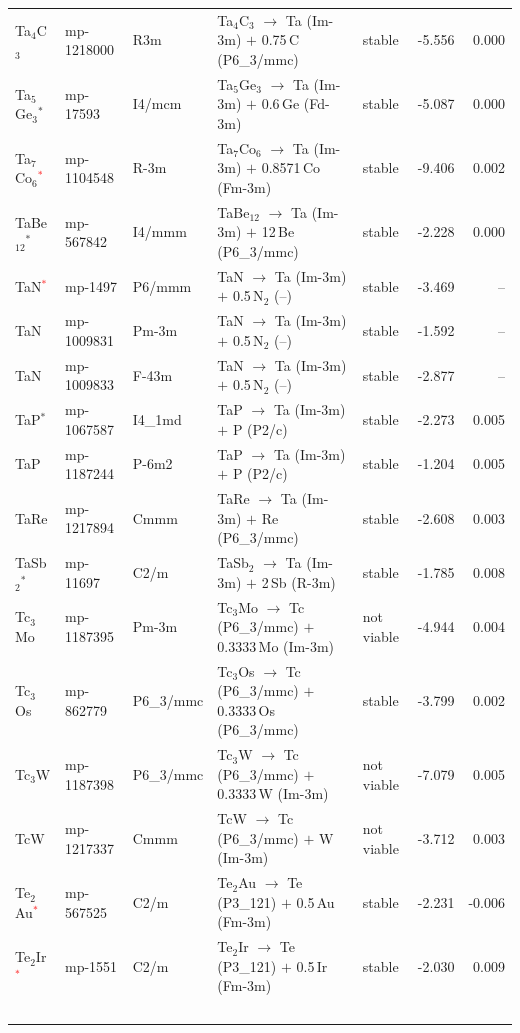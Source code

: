 \begin{longtable}{@{}ll l@{\hspace{4pt}} p{4.6cm} l@{\hspace{4pt}} rr@{}}
Ta$_{4}$C$_{3}$ & mp-1218000 & R3m & Ta$_{4}$C$_{3}$ $\to$ Ta (Im-3m) $+$ 0.75\,C (P6\_3/mmc) & stable & -5.556 & 0.000 \\
Ta$_{5}$Ge$_{3}$$^*$ & mp-17593 & I4/mcm & Ta$_{5}$Ge$_{3}$ $\to$ Ta (Im-3m) $+$ 0.6\,Ge (Fd-3m) & stable & -5.087 & 0.000 \\
Ta$_{7}$Co$_{6}$\textcolor{red}{$^*$} & mp-1104548 & R-3m & Ta$_{7}$Co$_{6}$ $\to$ Ta (Im-3m) $+$ 0.8571\,Co (Fm-3m) & stable & -9.406 & 0.002 \\
TaBe$_{12}$$^*$ & mp-567842 & I4/mmm & TaBe$_{12}$ $\to$ Ta (Im-3m) $+$ 12\,Be (P6\_3/mmc) & stable & -2.228 & 0.000 \\
TaN\textcolor{red}{$^*$} & mp-1497 & P6/mmm & TaN $\to$ Ta (Im-3m) $+$ 0.5\,N$_{2}$ (--) & stable & -3.469 & -- \\
TaN & mp-1009831 & Pm-3m & TaN $\to$ Ta (Im-3m) $+$ 0.5\,N$_{2}$ (--) & stable & -1.592 & -- \\
TaN & mp-1009833 & F-43m & TaN $\to$ Ta (Im-3m) $+$ 0.5\,N$_{2}$ (--) & stable & -2.877 & -- \\
TaP$^*$ & mp-1067587 & I4\_1md & TaP $\to$ Ta (Im-3m) $+$ P (P2/c) & stable & -2.273 & 0.005 \\
TaP & mp-1187244 & P-6m2 & TaP $\to$ Ta (Im-3m) $+$ P (P2/c) & stable & -1.204 & 0.005 \\
TaRe & mp-1217894 & Cmmm & TaRe $\to$ Ta (Im-3m) $+$ Re (P6\_3/mmc) & stable & -2.608 & 0.003 \\
TaSb$_{2}$$^*$ & mp-11697 & C2/m & TaSb$_{2}$ $\to$ Ta (Im-3m) $+$ 2\,Sb (R-3m) & stable & -1.785 & 0.008 \\
Tc$_{3}$Mo & mp-1187395 & Pm-3m & Tc$_{3}$Mo $\to$ Tc (P6\_3/mmc) $+$ 0.3333\,Mo (Im-3m) & not viable & -4.944 & 0.004 \\
Tc$_{3}$Os & mp-862779 & P6\_3/mmc & Tc$_{3}$Os $\to$ Tc (P6\_3/mmc) $+$ 0.3333\,Os (P6\_3/mmc) & stable & -3.799 & 0.002 \\
Tc$_{3}$W & mp-1187398 & P6\_3/mmc & Tc$_{3}$W $\to$ Tc (P6\_3/mmc) $+$ 0.3333\,W (Im-3m) & not viable & -7.079 & 0.005 \\
TcW & mp-1217337 & Cmmm & TcW $\to$ Tc (P6\_3/mmc) $+$ W (Im-3m) & not viable & -3.712 & 0.003 \\
Te$_{2}$Au\textcolor{red}{$^*$} & mp-567525 & C2/m & Te$_{2}$Au $\to$ Te (P3\_121) $+$ 0.5\,Au (Fm-3m) & stable & -2.231 & -0.006 \\
Te$_{2}$Ir\textcolor{red}{$^*$} & mp-1551 & C2/m & Te$_{2}$Ir $\to$ Te (P3\_121) $+$ 0.5\,Ir (Fm-3m) & stable & -2.030 & 0.009 \\
$$
\end{longtable}
